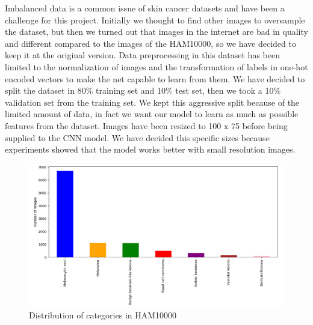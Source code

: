	Imbalanced data is a common issue of skin cancer datasets and have been a challenge for this project. Initially we thought to find other images to oversample the dataset, but then we turned out that images in the internet are bad in quality and different compared to the images of the HAM10000, so we have decided to keep it at the original version.
	Data preprocessing in this dataset has been limited to the normalization of images and the transformation of labels in one-hot encoded vectors to make the net capable to learn from them. We have decided to split the dataset in 80\% training set and 10\% test set, then we took a 10\% validation set from the training set. We kept this aggressive split because of the limited amount of data, in fact we want our model to learn as much as possible features from the dataset. Images have been resized to 100 x 75 before being supplied to the CNN model. We have decided this specific sizes because experiments showed that the model works better with small resolution images.
	
	\begin{figure}[H]
		\centering
		\includegraphics[width=15cm]{images/graph1.png}
		\caption{Distribution of categories in HAM10000}
		\label{fig:graph1}
	\end{figure}